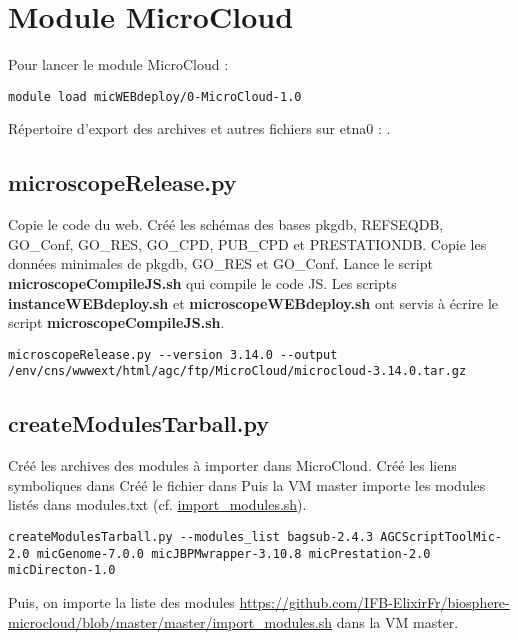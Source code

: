 \section {Module MicroCloud}

Pour lancer le module MicroCloud :
\begin{lstlisting}[style=bash]
module load micWEBdeploy/0-MicroCloud-1.0
\end{lstlisting}

Répertoire d'export des archives et autres fichiers sur etna0 : .

\subsection{microscopeRelease.py}
Copie le code du web.
\newline
Créé les schémas des bases pkgdb, REFSEQDB, GO\_Conf, GO\_RES, GO\_CPD, PUB\_CPD et PRESTATIONDB.
\newline
Copie les données minimales de pkgdb, GO\_RES et GO\_Conf.
\newline
Lance le script \textbf{microscopeCompileJS.sh} qui compile le code JS. Les scripts \textbf{instanceWEBdeploy.sh} et \textbf{microscopeWEBdeploy.sh} ont servis à écrire le script \textbf{microscopeCompileJS.sh}.

\begin{lstlisting}[style=bash]
microscopeRelease.py --version 3.14.0 --output /env/cns/wwwext/html/agc/ftp/MicroCloud/microcloud-3.14.0.tar.gz
\end{lstlisting}

\subsection{createModulesTarball.py}
Créé les archives des modules à importer dans MicroCloud.
\newline
Créé les liens symboliques dans 
\newline
Créé le fichier  dans 
\newline
Puis la VM master importe les modules listés dans modules.txt (cf. \href{https://github.com/IFB-ElixirFr/biosphere-microcloud/blob/master/master/import_modules.sh}{import\_modules.sh}).

\begin{lstlisting}[style=bash]
createModulesTarball.py --modules_list bagsub-2.4.3 AGCScriptToolMic-2.0 micGenome-7.0.0 micJBPMwrapper-3.10.8 micPrestation-2.0 micDirecton-1.0
\end{lstlisting}
Puis, on importe la liste des modules \url{https://github.com/IFB-ElixirFr/biosphere-microcloud/blob/master/master/import_modules.sh} dans la VM master.

